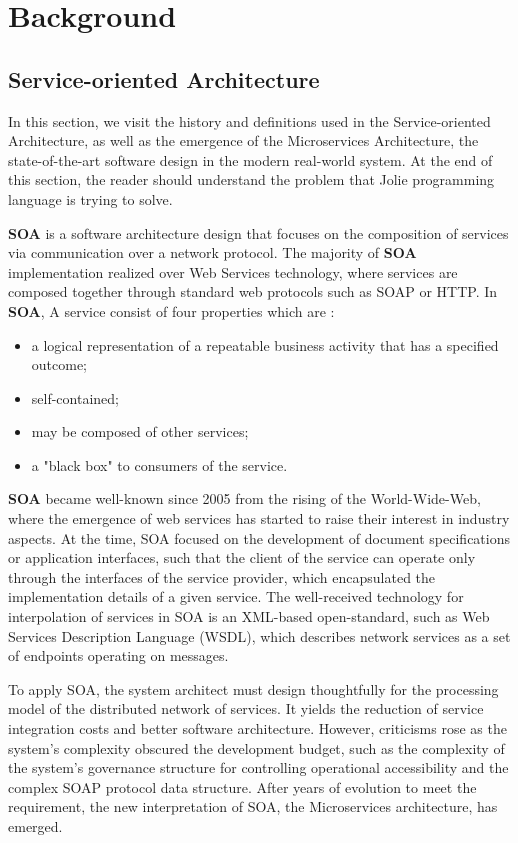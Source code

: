 \chapter{Background}

\section{Service-oriented Architecture}In this section, we visit the history and definitions used in the Service-oriented Architecture, as well as the emergence of the Microservices Architecture, the state-of-the-art software design in the modern real-world system. At the end of this section, the reader should understand the problem that Jolie programming language is trying to solve.

\textbf{SOA} is a software architecture design that focuses on the composition of services via communication over a network protocol. The majority of \textbf{SOA} implementation realized over Web Services technology, where services are composed together through standard web protocols such as SOAP\cite{Mendelsohn:07:SVP} or HTTP\cite{http-rfc}. In \textbf{SOA}, A service consist of four properties which are \cite{SOAopengroup} :

\begin{itemize}
    \item a logical representation of a repeatable business activity that has a specified outcome;
    \item self-contained;
    \item may be composed of other services;
    \item a "black box" to consumers of the service.
\end{itemize}

\textbf{SOA} became well-known since 2005 from the rising of the World-Wide-Web, where the emergence of web services has started to raise their interest in industry aspects. At the time, SOA focused on the development of document specifications or application interfaces, such that the client of the service can operate only through the interfaces of the service provider, which encapsulated the implementation details of a given service. The well-received technology for interpolation of services in SOA is an XML-based open-standard\cite{mahmoud-2005}, such as Web Services Description Language (WSDL)\cite{Moreau:07:WSD}, which describes network services as a set of endpoints operating on messages.

To apply SOA, the system architect must design thoughtfully for the processing model of the distributed network of services\cite{SOAopengroup-digitalage}. It yields the reduction of service integration costs and better software architecture. However, criticisms rose as the system's complexity obscured the development budget, such as the complexity of the system's governance structure for controlling operational accessibility and the complex SOAP protocol data structure\cite{SOAopengroup-digitalage}. After years of evolution to meet the requirement,
the new interpretation of SOA, the Microservices architecture, has emerged.

